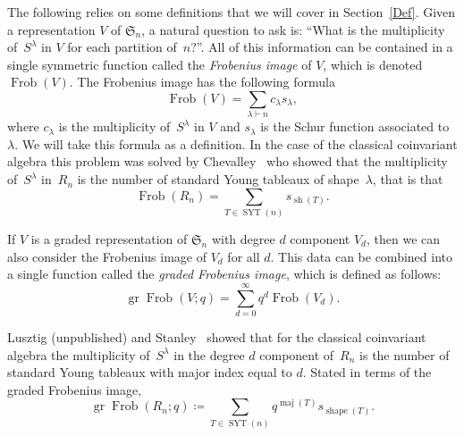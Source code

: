 \documentclass[ALCO,ThmDefs,Unicode,epreuves]{cedram}
\DeclareMathOperator{\Frob}{Frob}
\DeclareMathOperator{\gr}{gr}
\DeclareMathOperator{\maj}{maj}
\DeclareMathOperator{\shape}{shape}
\DeclareMathOperator{\sh}{sh}
\DeclareMathOperator{\SYT}{SYT}
\begin{document}
	The following relies on some definitions that we will cover in Section~\ref{Def}.
	Given a representation $V$ of $\mathfrak{S}_n$, a natural question to ask is: ``What is the multiplicity of~$S^\lambda$ in $
V$ for each partition of~$n$?''. All of this information can be contained in a single symmetric function called the \emph{Frobenius image} of $V$, which is denoted $\Frob (V)$. The Frobenius image has the following formula
\begin{equation}
	\Frob(V)=\sum_{\lambda\vdash n} c_\lambda s_\lambda,
\end{equation}
	where $c_\lambda$ is the multiplicity of~$S^\lambda$ in $V$ and $s_\lambda$ is the Schur function associated to~$\lambda$. 
	We will take this formula as a definition.
 In the case of the classical coinvariant algebra this problem was solved by Chevalley~\cite{C} who showed that the 
multiplicity of~$S^\lambda$ in~$R_n$ is the number of standard Young tableaux of shape~$\lambda$, that is that 
\begin{equation}
	\Frob (R_n)=\sum_{T\in \SYT(n)} s_{\sh(T)}.
\end{equation}

	If $V$ is a graded representation of $\mathfrak{S}_n$ with degree $d$ component $V_d$, then we can also consider the 
Frobenius image of $V_d$ for all $d$. This data can be combined into a single function called the \emph{graded Frobenius 
image}, which is defined as follows:
\begin{equation}
	\gr \Frob(V;q)=\sum_{d=0}^\infty q^d\Frob (V_d).
\end{equation}

	 Lusztig (unpublished) and Stanley~\cite{S} showed that for the classical coinvariant algebra the multiplicity of~$S^\lambda$ in the degree $d$ component of~$R_n$ is the number of standard Young tableaux with major index equal to 
$d$. Stated in terms of the graded Frobenius image,
\begin{equation}
\gr \Frob (R_n;q)\coloneqq \sum_{T\in \SYT(n)} q^{\maj(T)}s_{\shape(T)}.
\end{equation}
\end{document}

